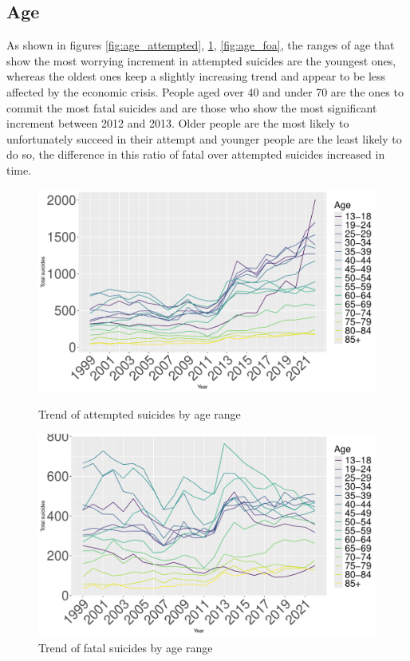 \documentclass{article}
\begin{document}
\subsection{Age}
As shown in figures \ref{fig:age_attempted}, 
\ref{fig:age_fatal}, \ref{fig:age_foa},
the ranges of age that show the most worrying increment in attempted suicides 
are the youngest ones, whereas the oldest ones keep a slightly increasing trend and 
appear to be less affected by the economic crisis.
People aged over 40 and under 70 are the ones to commit the most fatal suicides and are those
who show the most significant increment between 2012 and 2013.
Older people are the most likely to unfortunately succeed in their attempt and younger people
are the least likely to do so, the difference in this ratio of fatal over attempted suicides 
increased in time.
%
\begin{figure}[H]
    \centering
    \begin{minipage}{0.45\textwidth}
        \includegraphics[width=\textwidth]{imgs/age_attempted.pdf}
        \caption{Trend of attempted suicides by age range}
	\label{fig:age_attempted}
    \end{minipage}
    \hfill
    \begin{minipage}{0.45\textwidth}
        \includegraphics[width=\textwidth]{imgs/age_fatal.pdf}
        \caption{Trend of fatal suicides by age range}
	\label{fig:age_fatal}
    \end{minipage}
\end{figure}
\end{document}
